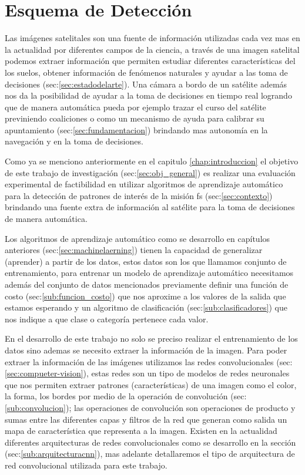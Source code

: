 \chapter{Esquema de Detección}\label{chap:tbd}

Las imágenes satelitales son una fuente de información utilizadas cada vez mas en la actualidad por diferentes campos de la ciencia, a través de una imagen satelital podemos extraer información que permiten estudiar diferentes características del los suelos, obtener información de fenómenos naturales y ayudar a las toma de decisiones (sec:\ref{sec:estadodelarte}). Una cámara a bordo de un satélite además nos da la posibilidad de ayudar a la toma de decisiones en tiempo real logrando que de manera automática pueda por ejemplo trazar el curso del satélite previniendo coaliciones o como un mecanismo de ayuda para calibrar su apuntamiento (sec:\ref{sec:fundamentacion}) brindando mas autonomía en la navegación y en la toma de decisiones. 

Como ya se menciono anteriormente en el  capitulo \ref{chap:introduccion} el objetivo de este trabajo de investigación  (sec:\ref{sec:obj_general}) es realizar una evaluación experimental de factibilidad en utilizar algoritmos de aprendizaje automático para  la detección de patrones de interés de la misión \ac{fs} (sec:\ref{sec:contexto})  brindando una  fuente extra de información al satélite para la toma de decisiones de manera automática. 

Los algoritmos de aprendizaje automático como se desarrollo en capítulos anteriores (sec:\ref{sec:machinelaerning}) tienen la capacidad de generalizar (aprender)  a partir de los datos, estos datos son los que llamamos conjunto de entrenamiento, para entrenar un modelo de aprendizaje automático necesitamos además del conjunto de datos mencionados previamente definir una función de costo (sec:\ref{sub:funcion_costo}) que nos aproxime a los valores de la salida que estamos esperando y un algoritmo de clasificación (sec:\ref{sub:clasificadores}) que nos indique a que clase o categoría pertenece cada valor. 

En el desarrollo de este trabajo no solo se preciso realizar el entrenamiento de los datos sino ademas se necesito extraer la información de la imagen. Para poder extraer la información de las imágenes utilizamos las redes convolucionales (sec:\ref{sec:compueter-vision}), estas redes son un tipo de modelos de redes neuronales que nos permiten extraer patrones (características) de una imagen como el color, la forma, los bordes por medio de la operación de convolución (sec:\ref{sub:convolucion}); las operaciones de convolución son operaciones de producto y sumas entre las diferentes capas y filtros de la red que generan como salida un mapa de característica que representa a la imagen. Existen en la actualidad diferentes arquitecturas de redes convolucionales como se desarrollo en la sección (sec:\ref{sub:arquitecturacnn}), mas adelante  detallaremos el tipo de arquitectura de red convolucional utilizada para este trabajo.

